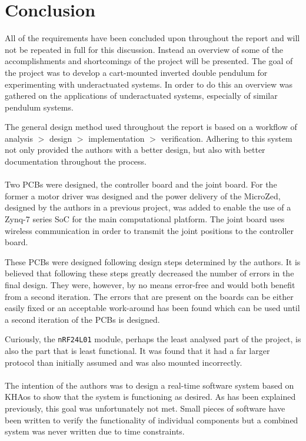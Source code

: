 \section{Conclusion} %
\label{sub:conclusion}
All of the requirements have been concluded upon throughout the report and  will not be repeated in full for this discussion.
Instead an overview of some of the accomplishments and shortcomings of the project will be presented.
The goal of the project was to develop a cart-mounted inverted double pendulum for experimenting with underactuated systems.
In order to do this an overview was gathered on the applications of underactuated systems, especially of similar pendulum systems.

The general design method used throughout the report is based on a workflow of analysis $>$ design $>$ implementation $>$ verification.
Adhering to this system not only provided the authors with a better design, but also with better documentation throughout the process.
\\~\\
Two PCBs were designed, the controller board and the joint board.
For the former a motor driver was designed and the power delivery of the MicroZed, designed by the authors in a previous project, was added to enable the use of a Zynq-7 series SoC for the main computational platform.
The joint board uses wireless communication in order to transmit the joint positions to the controller board.

These PCBs were designed following design steps determined by the authors.
It is believed that following these steps greatly decreased the number of errors in the final design.
They were, however, by no means error-free and would both benefit from a second iteration.
The errors that are present on the boards can be either easily fixed or an acceptable work-around has been found which can be used until a second iteration of the PCBs is designed.

Curiously, the \texttt{nRF24L01} module, perhaps the least analysed part of the project, is also the part that is least functional.
It was found that it had a far larger protocol than initially assumed and was also mounted incorrectly.
\\~\\
The intention of the authors was to design a real-time software system based on KHAos to show that the system is functioning as desired.
As has been explained previously, this goal was unfortunately not met.
Small pieces of software have been written to verify the functionality of individual components but a combined system was never written due to time constraints.

